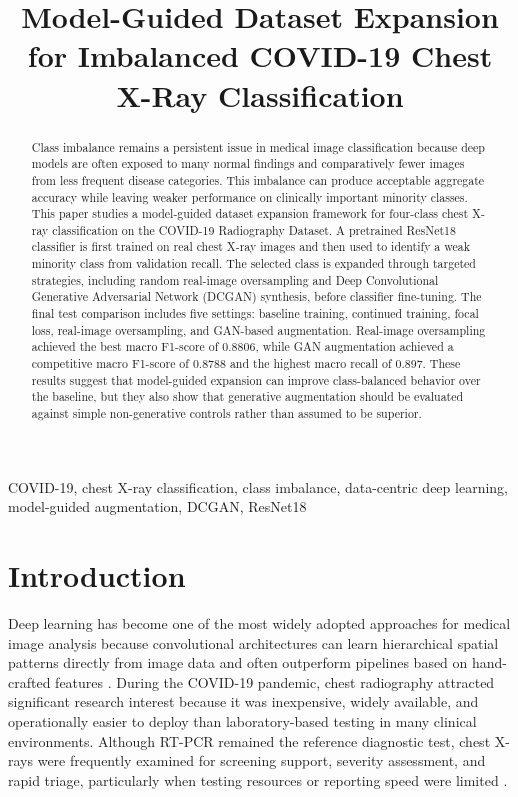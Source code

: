 \documentclass[conference]{IEEEtran}
\title{Model-Guided Dataset Expansion for Imbalanced COVID-19 Chest X-Ray Classification}
\author{%
\IEEEauthorblockN{Manas Zambre}
\IEEEauthorblockA{Department of Computer Engineering and Technology \\
MIT World Peace University \\
Pune, India}
}
\begin{document}
\maketitle

\begin{abstract}
Class imbalance remains a persistent issue in medical image classification because deep models are often exposed to many normal findings and comparatively fewer images from less frequent disease categories. This imbalance can produce acceptable aggregate accuracy while leaving weaker performance on clinically important minority classes. This paper studies a model-guided dataset expansion framework for four-class chest X-ray classification on the COVID-19 Radiography Dataset. A pretrained ResNet18 classifier is first trained on real chest X-ray images and then used to identify a weak minority class from validation recall. The selected class is expanded through targeted strategies, including random real-image oversampling and Deep Convolutional Generative Adversarial Network (DCGAN) synthesis, before classifier fine-tuning. The final test comparison includes five settings: baseline training, continued training, focal loss, real-image oversampling, and GAN-based augmentation. Real-image oversampling achieved the best macro F1-score of 0.8806, while GAN augmentation achieved a competitive macro F1-score of 0.8788 and the highest macro recall of 0.897. These results suggest that model-guided expansion can improve class-balanced behavior over the baseline, but they also show that generative augmentation should be evaluated against simple non-generative controls rather than assumed to be superior.
\end{abstract}

\begin{IEEEkeywords}
COVID-19, chest X-ray classification, class imbalance, data-centric deep learning, model-guided augmentation, DCGAN, ResNet18
\end{IEEEkeywords}

\section{Introduction}
Deep learning has become one of the most widely adopted approaches for medical image analysis because convolutional architectures can learn hierarchical spatial patterns directly from image data and often outperform pipelines based on hand-crafted features \cite{lecun2015,litjens2017}. During the COVID-19 pandemic, chest radiography attracted significant research interest because it was inexpensive, widely available, and operationally easier to deploy than laboratory-based testing in many clinical environments. Although RT-PCR remained the reference diagnostic test, chest X-rays were frequently examined for screening support, severity assessment, and rapid triage, particularly when testing resources or reporting speed were limited \cite{chowdhury2020,apostolopoulos2020,ozturk2020}.
\end{document}
